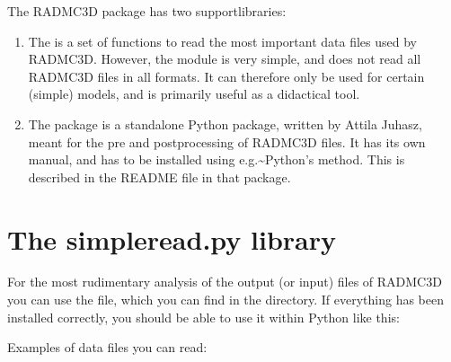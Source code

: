 \documentclass[letterpaper,10pt,english]{sphinxmanual}
\begin{document}
The RADMC\sphinxhyphen{}3D package has two support\sphinxhyphen{}libraries:
\begin{enumerate}
%
\item {} 

The  is a set of functions to read the most
important data files used by RADMC\sphinxhyphen{}3D.  However, the  module
is very simple, and does not read all RADMC\sphinxhyphen{}3D files in all formats. It can
therefore only be used for certain (simple) models, and is primarily useful
as a didactical tool.

\item {} 

The  package is a stand\sphinxhyphen{}alone Python package, written by Attila
Juhasz, meant for the pre\sphinxhyphen{} and post\sphinxhyphen{}processing of RADMC\sphinxhyphen{}3D files.  It has its
own manual, and has to be installed using e.g.\textasciitilde{}Python’s 
method. This is described in the README file in that package.

\end{enumerate}


\section{The simpleread.py library}
\label{\detokenize{pythontools:the-simpleread-py-library}}
For the most rudimentary analysis of the output (or input) files of RADMC\sphinxhyphen{}3D you
can use the  file, which you can find in the 
directory. If everything has been installed correctly, you should be able to
use it within Python like this:

\begin{sphinxVerbatim}[commandchars=\\\{\}]
   
\end{sphinxVerbatim}

Examples of data files you can read:
\end{document}
